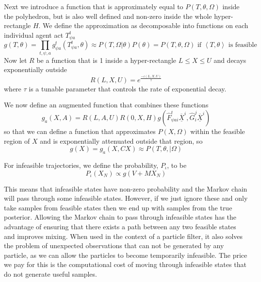\documentclass{article}
\begin{document}
Next we introduce a function that is approximately equal to $P(T,\theta,\Omega)$ inside the polyhedron, but is also well defined and non-zero inside the whole hyper-rectangle $H$. We define the approximation as decomposable into functions on each individual agent act $T^t_{\psi a}$
\[
g(T,\theta) = \prod_{t,\psi,a} g^t_{\psi a}(T^t_{\psi a},\theta) \approx P(T,\Omega|\theta)P(\theta) = P(T,\theta,\Omega) \text{ if }\left<T,\theta\right>\text{ is feasible}
\]
Now let $R$ be a function that is 1 inside a hyper-rectangle $L \le X \le U$ and decays exponentially outside
\[
R(L,X,U) = e^{\frac{-\iota(L,X,U)}{\tau}}
\]
where $\tau$ is a tunable parameter that controls the rate of exponential decay.

We now define an augmented function that combines these functions
\begin{equation}
g_a(X,A) = R\left(L,A,U\right)R(0,X,H)g\left(\hat{F}^t_{\psi a i}\overline{\underline{X}}^i, \hat{G}^j_i\overline{\underline{X}}^i\right)
\label{augmentedG}
\end{equation}
so that we can define a function that approximates $P(X,\Omega)$ within the feasible region of $X$ and is exponentially attenuated outside that region, so 
\[
g(X) = g_a\left(X,CX\right) \approx P(T,\theta,|\Omega)
\]

For infeasible trajectories, we define the probability, $P_\iota$, to be
\begin{equation}
P_\iota(X_N) \propto g(V+MX_N)
\label{loglinprob}
\end{equation}

This means that infeasible states have non-zero probability and the Markov chain will pass through some infeasible states.  However, if we just ignore these and only take samples from feasible states then we end up with samples from the true posterior. Allowing the Markov chain to pass through infeasible states has the advantage of ensuring that there exists a path between any two feasible states and improves mixing. When used in the context of a particle filter, it also solves the problem of unexpected observations that can not be generated by any particle, as we can allow the particles to become temporarily infeasible. The price we pay for this is the computational cost of moving through infeasible states that do not generate useful samples.
\end{document}
